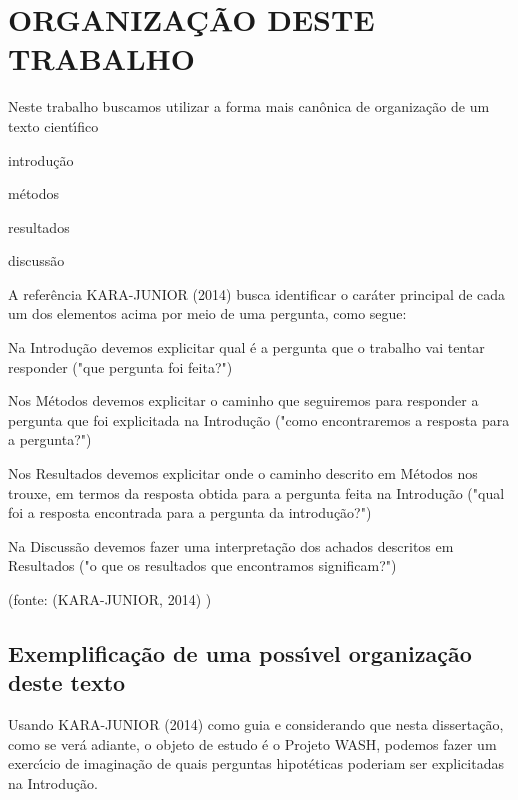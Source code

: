 \documentclass[
12pt,		%
openright,	%
twoside,  %
a4paper,			%
chapter=TITLE,		%
english,			%
french,				%
spanish,			%
brazil				%
]{USPSC-classe/USPSC}
\begin{document}
\chapter[ORGANIZA\c{C}\~AO DESTE TRABALHO]{ORGANIZA\c{C}\~AO DESTE TRABALHO}\label{ORGANIZA\c{C}\~AO DESTE TRABALHO}
Neste trabalho buscamos utilizar a forma mais can\^onica de organiza\c{c}\~ao de um texto cient\'{\i}fico



\begin{alineas}
\item introdu\c{c}\~ao
\item m\'etodos
\item resultados
\item discuss\~ao
\end{alineas}

A refer\^encia KARA-JUNIOR (2014) busca identificar o car\'ater principal de cada um dos elementos acima por meio de uma pergunta, como segue:



\begin{alineas}
\item Na Introdu\c{c}\~ao devemos explicitar qual \'e a pergunta que o trabalho vai tentar responder   ("que pergunta foi feita?")
\item Nos M\'etodos devemos explicitar o caminho que seguiremos para responder a pergunta que foi explicitada na Introdu\c{c}\~ao ("como encontraremos a resposta para a pergunta?")
\item Nos Resultados devemos explicitar onde o caminho descrito em M\'etodos nos trouxe, em termos da resposta obtida para a pergunta feita na Introdu\c{c}\~ao ("qual foi a resposta encontrada para a pergunta da introdu\c{c}\~ao?")
\item Na Discuss\~ao devemos fazer uma interpreta\c{c}\~ao dos achados descritos em Resultados ("o que os resultados que encontramos significam?")
\end{alineas}

\begin{flushright}
\setlength{\absparsep}{0pt}
\tiny \begin{flushright}
\setlength{\absparsep}{0pt}
\tiny (fonte:  (KARA-JUNIOR, 2014) ) \normalsize 
\end{flushright}

 \normalsize 
\end{flushright}


\section[Exemplifica\c{c}\~ao de uma poss\'{\i}vel organiza\c{c}\~ao deste texto]{Exemplifica\c{c}\~ao de uma poss\'{\i}vel organiza\c{c}\~ao deste texto}\label{Exemplifica\c{c}\~ao de uma poss\'{\i}vel organiza\c{c}\~ao deste texto}
Usando  KARA-JUNIOR (2014) como guia e considerando que nesta disserta\c{c}\~ao, como se ver\'a adiante, o objeto de estudo \'e o Projeto WASH, podemos fazer um exerc\'{\i}cio de imagina\c{c}\~ao de quais perguntas hipot\'eticas poderiam ser explicitadas na Introdu\c{c}\~ao.
\end{document}
